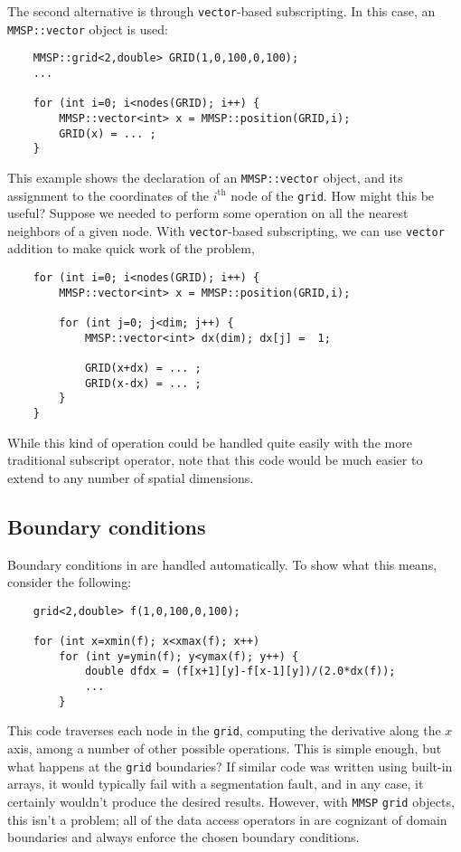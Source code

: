 The second alternative is through {\tt vector}-based subscripting.  In this case, an {\tt MMSP::vector} object is used:
\begin{shadebox}
\begin{verbatim}
    MMSP::grid<2,double> GRID(1,0,100,0,100);
    ...

    for (int i=0; i<nodes(GRID); i++) {
        MMSP::vector<int> x = MMSP::position(GRID,i);
        GRID(x) = ... ;
    }
\end{verbatim}
\end{shadebox}
This example shows the declaration of an {\tt MMSP::vector} object, and its assignment to the coordinates of the $i^\text{th}$ node of the {\tt grid}.  How might this be useful?  Suppose we needed to perform some operation on all the nearest neighbors of a given node.  With {\tt vector}-based subscripting, we can use {\tt vector} addition to make quick work of the problem,
\begin{shadebox}
\begin{verbatim}
    for (int i=0; i<nodes(GRID); i++) {
        MMSP::vector<int> x = MMSP::position(GRID,i);

        for (int j=0; j<dim; j++) {
            MMSP::vector<int> dx(dim); dx[j] =  1;

            GRID(x+dx) = ... ;
            GRID(x-dx) = ... ;
        }
    }
\end{verbatim}
\end{shadebox}
While this kind of operation could be handled quite easily with the more traditional subscript operator, note that this code would be much easier to extend to any number of spatial dimensions.

\subsection{Boundary conditions}
Boundary conditions in \MMSP are handled automatically.  To show what this means, consider the following:
\begin{shadebox}
\begin{verbatim}
    grid<2,double> f(1,0,100,0,100);

    for (int x=xmin(f); x<xmax(f); x++)
        for (int y=ymin(f); y<ymax(f); y++) {
            double dfdx = (f[x+1][y]-f[x-1][y])/(2.0*dx(f));
            ...
        }
\end{verbatim}
\end{shadebox}
This code traverses each node in the {\tt grid}, computing the derivative along the $x$ axis, among a number of other possible operations.  This is simple enough, but what happens at the {\tt grid} boundaries?  If similar code was written using built-in arrays, it would typically fail with a segmentation fault, and in any case, it certainly wouldn't produce the desired results.  However, with {\tt MMSP} {\tt grid} objects, this isn't a problem; all of the data access operators in \MMSP are cognizant of domain boundaries and always enforce the chosen boundary conditions.

